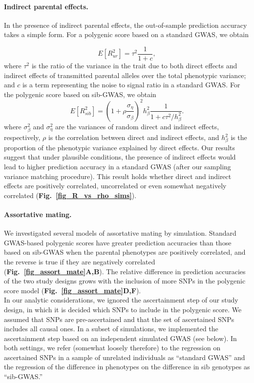 \documentclass[hidelinks, 12pt]{article}
\begin{document}
\paragraph{Indirect parental effects.}  In the presence of indirect parental effects, the out-of-sample prediction accuracy takes a simple form. For a polygenic score based on a standard GWAS, we obtain

$$E[R_{ur}^2] = \tau^2\frac{1}{1+c},$$ where $\tau^2$ is the ratio of the variance in the trait due to both direct effects and indirect effects of transmitted parental alleles over the total phenotypic variance; and $c$ is a term representing the noise to signal ratio in a standard GWAS.  For the polygenic score based on sib-GWAS, we obtain
$$E[R_{sib}^2] = (1+\rho \frac{\sigma_\eta}{\sigma_\beta})^2 h_\beta^2 \frac{1}{1 + c \tau^2/h_\beta^2}.
$$ where $\sigma_\beta^2$ and $\sigma_\eta^2$ are the variances of random direct and indirect effects, respectively, $\rho$ is the correlation between direct and indirect effects, and $h_{\beta}^2$ is the proportion of the phenotypic variance explained by direct effects.  Our results suggest that under plausible conditions, the presence of indirect effects would lead to higher prediction accuracy in a standard GWAS (after our sampling variance matching procedure).  This result holds whether direct and indirect effects are positively correlated, uncorrelated or even somewhat negatively correlated ({\bf Fig.~\ref{fig_R_vs_rho_sims}}).

\paragraph{Assortative mating.}  We investigated several models of assortative mating by simulation. Standard GWAS-based polygenic scores have greater prediction accuracies than those based on sib-GWAS when the parental phenotypes are positively correlated, and the reverse is true if they are negatively correlated ({\bf Fig.~\ref{fig_assort_mate}A,B}).  The relative difference in prediction accuracies of the two study designs grows with the inclusion of more SNPs in the polygenic score model ({\bf Fig.~\ref{fig_assort_mate}D,F}).\\

In our analytic considerations, we ignored the ascertainment step of our study design, in which it is decided which SNPs to include in the polygenic score. We assumed that SNPs are pre-ascertained and that the set of ascertained SNPs includes all causal ones. In a subset of simulations, we implemented the ascertainment step based on an independent simulated GWAS (see below).  In both settings, we refer (somewhat loosely therefore) to the regression on ascertained SNPs in a sample of unrelated individuals as ``standard GWAS'' and the regression of the difference in phenotypes on the difference in sib genotypes as ``sib-GWAS.'' 
\end{document}
